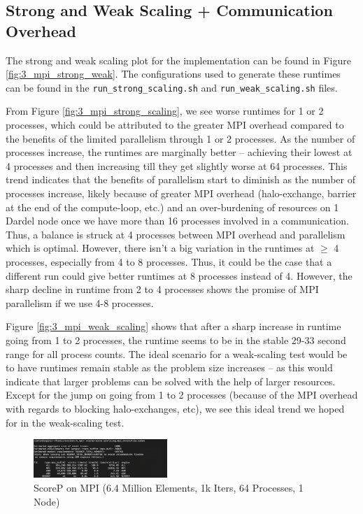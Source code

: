 \documentclass[a4paper,10pt]{article}
\begin{document}
\begin{multicols}{2}
\subsection{Strong and Weak Scaling + Communication Overhead}
\label{sec:3_mpi_analysis}

The strong and weak scaling plot for the implementation can be found in Figure \ref{fig:3_mpi_strong_weak}. The configurations used to generate these runtimes can be found in the \verb|run_strong_scaling.sh| and \verb|run_weak_scaling.sh| files.

From Figure \ref{fig:3_mpi_strong_scaling}, we see worse runtimes for 1 or 2 processes, which could be attributed to the greater MPI overhead compared to the benefits of the limited parallelism through 1 or 2 processes. As the number of processes increase, the runtimes are marginally better -- achieving their lowest at 4 processes and then increasing till they get slightly worse at 64 processes. This trend indicates that the benefits of parallelism start to diminish as the number of processes increase, likely because of greater MPI overhead (halo-exchange, barrier at the end of the compute-loop, etc.) and an over-burdening of resources on 1 Dardel node once we have more than 16 processes involved in a communication. Thus, a balance is struck at 4 processes between MPI overhead and parallelism which is optimal. However, there isn't a big variation in the runtimes at $\geq$ 4 processes, especially from 4 to 8 processes. Thus, it could be the case that a different run could give better runtimes at 8 processes instead of 4. However, the sharp decline in runtime from 2 to 4 processes shows the promise of MPI parallelism if we use 4-8 processes. 

Figure \ref{fig:3_mpi_weak_scaling} shows that after a sharp increase in runtime going from 1 to 2 processes, the runtime seems to be in the stable 29-33 second range for all process counts. The ideal scenario for a weak-scaling test would be to have runtimes remain stable as the problem size increases -- as this would indicate that larger problems can be solved with the help of larger resources. Except for the jump on going from 1 to 2 processes (because of the MPI overhead with regards to blocking halo-exchanges, etc), we see this ideal trend we hoped for in the weak-scaling test. 

\begin{figure}[H]
  \centering
  \includegraphics[width=0.45\textwidth]{../images/4_opt/scorep_64_mpi.png}
  \caption{ScoreP on MPI (6.4 Million Elements, 1k Iters, 64 Processes, 1 Node)}
  \label{fig:3_mpi_scorep_64}
\end{figure}


\end{multicols}
\end{document}

